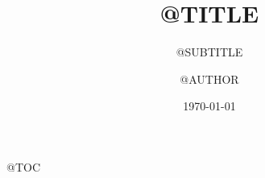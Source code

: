 \documentclass[aspectratio=169,10pt]{beamer}  %
\title{@TITLE}
\subtitle{@SUBTITLE}
\author[@AUTHOR]{@AUTHOR}
\date{\today}
\begin{document}

\begin{frame}
  \titlepage
\end{frame}

@TOC


\end{document}
